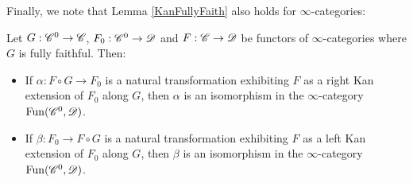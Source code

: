 \documentclass[../../thesis.tex]{subfiles}
\begin{document}
Finally, we note that Lemma \ref{KanFullyFaith} also holds for $\infty$-categories:
\begin{proposition}\label{KanFullyFaithInfty}
    Let $G : \mathscr{C}^{0} \to \mathscr{C}$, $F_0: \mathscr{C}^{0} \to \mathscr{D}$ and $F: \mathscr{C} \to \mathscr{D}$ be functors of $\infty$-categories where $G$ is fully faithful.
    Then:
    \begin{itemize}
        \item If $\alpha : F \circ G \to F_0$ is a natural transformation exhibiting $F$ as a right Kan extension of $F_0$ along $G$, then $\alpha$ is an isomorphism in the $\infty$-category $\mathrm{Fun}(\mathscr{C}^{0}, \mathscr{D})$.
        \item If $\beta : F_0 \to F \circ G$ is a natural transformation exhibiting $F$ as a left Kan extension of $F_0$ along $G$, then $\beta$ is an isomorphism in the $\infty$-category $\mathrm{Fun}(\mathscr{C}^{0}, \mathscr{D})$.
    \end{itemize}
\end{proposition}
\end{document}
